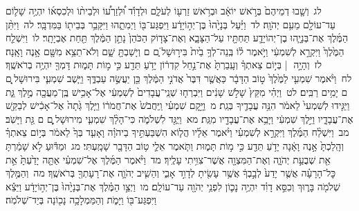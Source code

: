 \documentclass[18pt]{article}
\begin{document}
 {\loc לג~}וְשָׁ֤בוּ דְמֵיהֶם֙ בְּרֹ֣אשׁ יוֹאָ֔ב וּבְרֹ֥אשׁ זַרְע֖וֹ לְעֹלָ֑ם וּלְדָוִ֡ד וּ֠לְזַרְע֠וֹ וּלְבֵית֨וֹ וּלְכִסְא֜וֹ יִהְיֶ֥ה שָׁל֛וֹם עַד־עוֹלָ֖ם מֵעִ֥ם יְהֹוָֽה׃ \startlock
 {\loc לד~}וַיַּ֗עַל בְּנָיָ֙הוּ֙ בֶּן־יְה֣וֹיָדָ֔ע וַיִּפְגַּע־בּ֖וֹ וַיְמִתֵ֑הוּ וַיִּקָּבֵ֥ר בְּבֵית֖וֹ בַּמִּדְבָּֽר׃ \startlock
 {\loc לה~}וַיִּתֵּ֨ן הַמֶּ֜לֶךְ אֶת־בְּנָיָ֧הוּ בֶן־יְהוֹיָדָ֛ע תַּחְתָּ֖יו עַל־הַצָּבָ֑א וְאֶת־צָד֤וֹק הַכֹּהֵן֙ נָתַ֣ן הַמֶּ֔לֶךְ תַּ֖חַת אֶבְיָתָֽר׃ \startlock
 {\loc לו~}וַיִּשְׁלַ֤ח הַמֶּ֙לֶךְ֙ וַיִּקְרָ֣א לְשִׁמְעִ֔י וַיֹּ֣אמֶר ל֗וֹ בְּֽנֵה־לְךָ֥ בַ֙יִת֙ בִּיר֣וּשָׁל ַ֔͏ְם ם וְיָשַׁבְתָּ֖ שָׁ֑ם וְלֹא־תֵצֵ֥א מִשָּׁ֖ם אָ֥נֶה וָאָֽנָה׃ \startlock
 {\loc לז~}וְהָיָ֣ה  |  בְּי֣וֹם צֵאתְךָ֗ וְעָֽבַרְתָּ֙ אֶת־נַ֣חַל קִדְר֔וֹן יָדֹ֥עַ תֵּדַ֖ע כִּ֣י מ֣וֹת תָּמ֑וּת דָּמְךָ֖ יִהְיֶ֥ה בְרֹאשֶֽׁךָ׃ \startlock
 {\loc לח~}וַיֹּ֨אמֶר שִׁמְעִ֤י לַמֶּ֙לֶךְ֙ ט֣וֹב הַדָּבָ֔ר כַּאֲשֶׁ֤ר דִּבֶּר֙ אֲדֹנִ֣י הַמֶּ֔לֶךְ כֵּ֖ן יַעֲשֶׂ֣ה עַבְדֶּ֑ךָ וַיֵּ֧שֶׁב שִׁמְעִ֛י בִּירוּשָׁל ַ֖͏ְם ם יָמִ֥ים רַבִּֽים׃ \startlock
 {\loc לט~}וַיְהִ֗י מִקֵּץ֙ שָׁלֹ֣שׁ שָׁנִ֔ים וַיִּבְרְח֤וּ שְׁנֵֽי־עֲבָדִים֙ לְשִׁמְעִ֔י אֶל־אָכִ֥ישׁ בֶּֽן־מַעֲכָ֖ה מֶ֣לֶךְ גַּ֑ת וַיַּגִּ֤ידוּ לְשִׁמְעִי֙ לֵאמֹ֔ר הִנֵּ֥ה עֲבָדֶ֖יךָ בְּגַֽת׃ \startlock
 {\loc מ~}וַיָּ֣קׇם שִׁמְעִ֗י וַֽיַּחֲבֹשׁ֙ אֶת־חֲמֹר֔וֹ וַיֵּ֤לֶךְ גַּ֙תָה֙ אֶל־אָכִ֔ישׁ לְבַקֵּ֖שׁ אֶת־עֲבָדָ֑יו וַיֵּ֣לֶךְ שִׁמְעִ֔י וַיָּבֵ֥א אֶת־עֲבָדָ֖יו מִגַּֽת׃ \startlock
 {\loc מא~}וַיֻּגַּ֖ד לִשְׁלֹמֹ֑ה כִּי־הָלַ֨ךְ שִׁמְעִ֧י מִירוּשָׁל ַ֛͏ְם ם גַּ֖ת וַיָּשֹֽׁב׃ \startlock
 {\loc מב~}וַיִּשְׁלַ֨ח הַמֶּ֜לֶךְ וַיִּקְרָ֣א לְשִׁמְעִ֗י וַיֹּ֨אמֶר אֵלָ֜יו הֲל֧וֹא הִשְׁבַּעְתִּ֣יךָ בַיהֹוָ֗ה וָאָעִ֤ד בְּךָ֙ לֵאמֹ֔ר בְּי֣וֹם צֵאתְךָ֗ וְהָֽלַכְתָּ֙ אָ֣נֶה וָאָ֔נָה יָדֹ֥עַ תֵּדַ֖ע כִּ֣י מ֣וֹת תָּמ֑וּת וַתֹּ֧אמֶר אֵלַ֛י ט֥וֹב הַדָּבָ֖ר שָׁמָֽעְתִּי׃ \startlock
 {\loc מג~}וּמַדּ֕וּעַ לֹ֣א שָׁמַ֔רְתָּ אֵ֖ת שְׁבֻעַ֣ת יְהֹוָ֑ה וְאֶת־הַמִּצְוָ֖ה אֲשֶׁר־צִוִּ֥יתִי עָלֶֽיךָ׃ \startlock
 {\loc מד~}וַיֹּ֨אמֶר הַמֶּ֜לֶךְ אֶל־שִׁמְעִ֗י אַתָּ֤ה יָדַ֙עְתָּ֙ אֵ֣ת כׇּל־הָרָעָ֗ה אֲשֶׁ֤ר יָדַע֙ לְבָ֣בְךָ֔ אֲשֶׁ֥ר עָשִׂ֖יתָ לְדָוִ֣ד אָבִ֑י וְהֵשִׁ֧יב יְהֹוָ֛ה אֶת־רָעָתְךָ֖ בְּרֹאשֶֽׁךָ׃ \startlock
 {\loc מה~}וְהַמֶּ֥לֶךְ שְׁלֹמֹ֖ה בָּר֑וּךְ וְכִסֵּ֣א דָוִ֗ד יִהְיֶ֥ה נָכ֛וֹן לִפְנֵ֥י יְהֹוָ֖ה עַד־עוֹלָֽם׃ \startlock
 {\loc מו~}וַיְצַ֣ו הַמֶּ֗לֶךְ אֶת־בְּנָיָ֙הוּ֙ בֶּן־יְה֣וֹיָדָ֔ע וַיֵּצֵ֕א וַיִּפְגַּע־בּ֖וֹ וַיָּמֹ֑ת וְהַמַּמְלָכָ֥ה נָכ֖וֹנָה בְּיַד־שְׁלֹמֹֽה׃ 
\startlock
\end{document}
